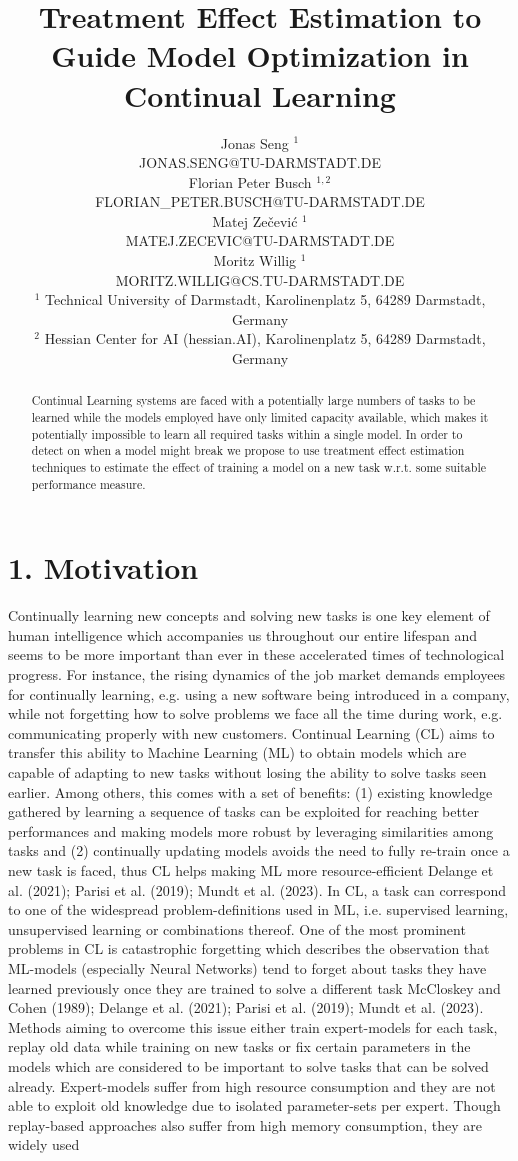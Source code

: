 \documentclass[10pt]{article}
\title{Treatment Effect Estimation to Guide Model Optimization in Continual Learning }
\author{Jonas Seng ${ }^{1}$\\
JONAS.SENG@TU-DARMSTADT.DE\\
Florian Peter Busch ${ }^{1,2}$\\
FLORIAN\_PETER.BUSCH@TU-DARMSTADT.DE\\
Matej Zečević ${ }^{1}$\\
MATEJ.ZECEVIC@TU-DARMSTADT.DE\\
Moritz Willig ${ }^{1}$\\
MORITZ.WILLIG@CS.TU-DARMSTADT.DE\\
${ }^{1}$ Technical University of Darmstadt, Karolinenplatz 5, 64289 Darmstadt, Germany\\
${ }^{2}$ Hessian Center for AI (hessian.AI), Karolinenplatz 5, 64289 Darmstadt, Germany}
\date{}
\begin{document}
\maketitle
\captionsetup{singlelinecheck=false}


\begin{abstract}
Continual Learning systems are faced with a potentially large numbers of tasks to be learned while the models employed have only limited capacity available, which makes it potentially impossible to learn all required tasks within a single model. In order to detect on when a model might break we propose to use treatment effect estimation techniques to estimate the effect of training a model on a new task w.r.t. some suitable performance measure.
\end{abstract}

\section*{1. Motivation}
Continually learning new concepts and solving new tasks is one key element of human intelligence which accompanies us throughout our entire lifespan and seems to be more important than ever in these accelerated times of technological progress. For instance, the rising dynamics of the job market demands employees for continually learning, e.g. using a new software being introduced in a company, while not forgetting how to solve problems we face all the time during work, e.g. communicating properly with new customers. Continual Learning (CL) aims to transfer this ability to Machine Learning (ML) to obtain models which are capable of adapting to new tasks without losing the ability to solve tasks seen earlier. Among others, this comes with a set of benefits: (1) existing knowledge gathered by learning a sequence of tasks can be exploited for reaching better performances and making models more robust by leveraging similarities among tasks and (2) continually updating models avoids the need to fully re-train once a new task is faced, thus CL helps making ML more resource-efficient Delange et al. (2021); Parisi et al. (2019); Mundt et al. (2023). In CL, a task can correspond to one of the widespread problem-definitions used in ML, i.e. supervised learning, unsupervised learning or combinations thereof. One of the most prominent problems in CL is catastrophic forgetting which describes the observation that ML-models (especially Neural Networks) tend to forget about tasks they have learned previously once they are trained to solve a different task McCloskey and Cohen (1989); Delange et al. (2021); Parisi et al. (2019); Mundt et al. (2023). Methods aiming to overcome this issue either train expert-models for each task, replay old data while training on new tasks or fix certain parameters in the models which are considered to be important to solve tasks that can be solved already. Expert-models suffer from high resource consumption and they are not able to exploit old knowledge due to isolated parameter-sets per expert. Though replay-based approaches also suffer from high memory consumption, they are widely used\\
\end{document}
